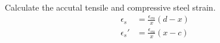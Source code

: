 Calculate the accutal tensile and compressive steel strain.
\begin{align*}
  \epsilon_{s} &= \frac{\epsilon_{cu}}{x}(d-x) \\
  \epsilon_{s}'&= \frac{\epsilon_{cu}}{x}(x-c)
\end{align*}